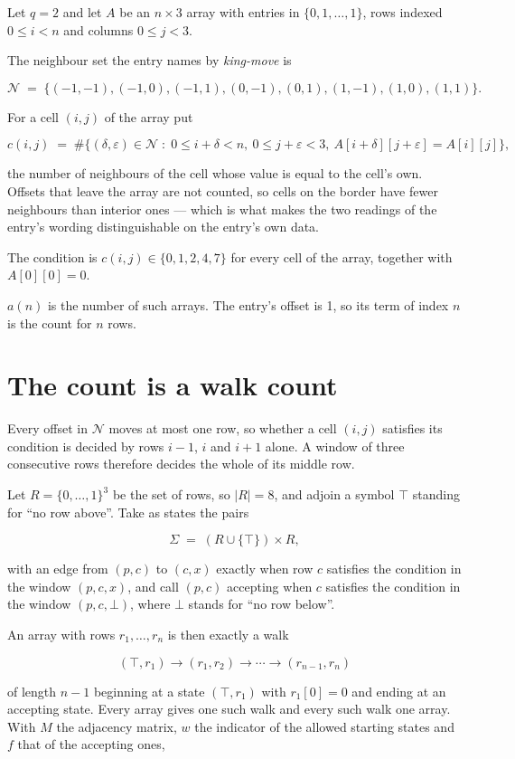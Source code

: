 \documentclass[11pt]{article}
\theoremstyle{definition}
\begin{document}
Let $q = 2$ and let $A$ be an $n \times 3$ array with entries in $\{0,1,\dots,1\}$, rows indexed $0 \le i < n$ and columns $0 \le j < 3$.

The neighbour set the entry names by {\itshape king-move} is

\[\mathcal{N} \;=\; \{(-1,-1), (-1,0), (-1,1), (0,-1), (0,1), (1,-1), (1,0), (1,1)\}.\]

For a cell $(i,j)$ of the array put

\[c(i,j) \;=\; \#\bigl\{(\delta,\varepsilon)\in\mathcal{N} \;:\; 0\le i+\delta<n,\ 0\le j+\varepsilon<3,\ A[i+\delta][j+\varepsilon] = A[i][j]\bigr\},\]

the number of neighbours of the cell whose value is equal to the cell's own. Offsets that leave the array are not counted, so cells on the border have fewer neighbours than interior ones --- which is what makes the two readings of the entry's wording distinguishable on the entry's own data.

The condition is $c(i,j) \in \{0, 1, 2, 4, 7\}$ for every cell of the array, together with $A[0][0]=0$.

$a(n)$ is the number of such arrays. The entry's offset is 1, so its term of index $n$ is the count for $n$ rows.

\section{The count is a walk count}

Every offset in $\mathcal{N}$ moves at most one row, so whether a cell $(i,j)$ satisfies its condition is decided by rows $i-1$, $i$ and $i+1$ alone. A window of three consecutive rows therefore decides the whole of its middle row.

Let $R = \{0,\dots,1\}^{3}$ be the set of rows, so $|R| = 8$, and adjoin a symbol $\top$ standing for ``no row above''. Take as states the pairs

\[\Sigma \;=\; (R \cup \{\top\}) \times R,\]

with an edge from $(p,c)$ to $(c,x)$ exactly when row $c$ satisfies the condition in the window $(p,c,x)$, and call $(p,c)$ accepting when $c$ satisfies the condition in the window $(p,c,\bot)$, where $\bot$ stands for ``no row below''.

An array with rows $r_1,\dots,r_n$ is then exactly a walk

\[(\top,r_1) \to (r_1,r_2) \to \cdots \to (r_{n-1},r_n)\]

of length $n-1$ beginning at a state $(\top,r_1)$ with $r_1[0]=0$ and ending at an accepting state. Every array gives one such walk and every such walk one array. With $M$ the adjacency matrix, $w$ the indicator of the allowed starting states and $f$ that of the accepting ones,
\end{document}
